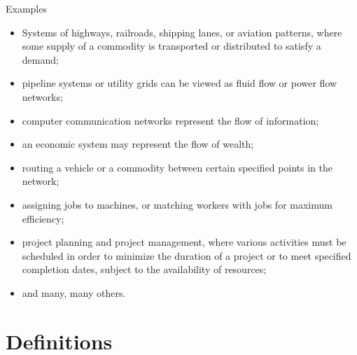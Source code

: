 \documentclass[c]{beamer}
\begin{document}
\begin{frame}{Examples}
\begin{itemize}
    \item Systems of highways, railroads, shipping lanes, or aviation patterns, where some supply of a commodity is transported or distributed to satisfy a demand;
    \item pipeline systems or utility grids can be viewed as fluid flow or power flow networks;
    \item computer communication networks represent the flow of information;
    \item an economic system may represent the flow of wealth;
    \item routing a vehicle or a commodity between certain specified points in the network;
    \item assigning jobs to machines, or matching workers with jobs for maximum efficiency;
    \item project planning and project management, where various activities must be scheduled in order to minimize the duration of a project or to meet specified completion dates, subject to the availability of resources;
    \item and many, many others.
\end{itemize}
\end{frame}

\section{Definitions}
\end{document}
